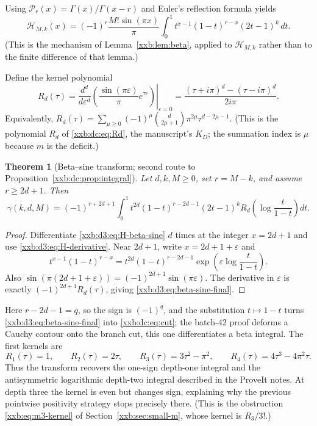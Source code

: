 \documentclass[11pt,a4paper]{article}
\numberwithin{equation}{section}
\newtheorem{theorem}{Theorem}[section]
\theoremstyle{definition}
\theoremstyle{remark}
\theoremstyle{plain}
\begin{document}
Using $\mathcal P_r(x)=\Gamma(x)/\Gamma(x-r)$ and Euler's reflection formula
yields
\begin{equation}
 \label{xxb:d3:eq:H-beta-sine}
 \mathcal H_{M,k}(x)
 =(-1)^r\frac{M!\sin(\pi x)}{\pi}
 \int_0^1t^{x-1}(1-t)^{r-x}(2t-1)^k\,dt.
\end{equation}
(This is the mechanism of Lemma~\ref{xxb:lem:beta}, applied to
$\mathcal H_{M,k}$ rather than to the finite difference of that lemma.)

Define the kernel polynomial
\begin{equation}
 \label{xxb:d3:eq:KD}
 R_d(\tau)=\left.\frac{d^d}{d\varepsilon^d}
 \left(\frac{\sin(\pi \varepsilon)}{\pi}e^{\tau \varepsilon}\right)\right|_{\varepsilon=0}
 =\frac{(\tau+i\pi)^d-(\tau-i\pi)^d}{2i\pi}.
\end{equation}
Equivalently,
$R_d(\tau)=\sum_{\mu\geq0}(-1)^\mu\binom d{2\mu+1}\pi^{2\mu}\tau^{d-2\mu-1}$.
(This is the polynomial $R_d$ of \eqref{xxb:dc:eq:Rd}, the manuscript's $K_D$;
the summation index is $\mu$ because $m$ is the deficit.)

\begin{theorem}[Beta--sine transform; second route to Proposition~\ref{xxb:dc:prop:integral}]
\label{xxb:d3:thm:beta-sine}
Let $d,k,M\geq0$, set $r=M-k$, and assume $r\geq 2d+1$.  Then
\begin{equation}
 \label{xxb:d3:eq:beta-sine-final}
 \gamma(k,d,M)=(-1)^{r+2d+1}
 \int_0^1 t^{2d}(1-t)^{r-2d-1}(2t-1)^k
 R_d\!\left(\log\frac{t}{1-t}\right)dt.
\end{equation}
\end{theorem}

\begin{proof}
Differentiate \eqref{xxb:d3:eq:H-beta-sine} $d$ times at the integer
$x=2d+1$ and use \eqref{xxb:d3:eq:H-derivative}.  Near $2d+1$, write
$x=2d+1+\varepsilon$ and
\[
 t^{x-1}(1-t)^{r-x}
 =t^{2d}(1-t)^{r-2d-1}
 \exp\!\left(\varepsilon\log\frac{t}{1-t}\right).
\]
Also $\sin(\pi(2d+1+\varepsilon))=(-1)^{2d+1}\sin(\pi \varepsilon)$.  The
derivative in $\varepsilon$ is exactly $(-1)^{2d+1}R_d(\tau)$, giving
\eqref{xxb:d3:eq:beta-sine-final}.
\end{proof}

Here $r-2d-1=q$, so the sign is $(-1)^q$, and the substitution
$t\mapsto1-t$ turns \eqref{xxb:d3:eq:beta-sine-final} into
\eqref{xxb:dc:eq:cut}; the batch-42 proof deforms a Cauchy contour onto the
branch cut, this one differentiates a beta integral.  The first kernels are
\[
 R_1(\tau)=1,
 \qquad R_2(\tau)=2\tau,
 \qquad R_3(\tau)=3\tau^2-\pi^2,
 \qquad R_4(\tau)=4\tau^3-4\pi^2\tau.
\]
Thus the transform recovers the one-sign depth-one integral and the
antisymmetric logarithmic depth-two integral described in the ProveIt notes.
At depth three the kernel is even but changes sign, explaining why the previous
pointwise positivity strategy stops precisely there.  (This is the obstruction
\eqref{xxb:eq:m3-kernel} of Section~\ref{xxb:sec:small-m}, whose kernel is
$R_3/3!$.)
\end{document}
